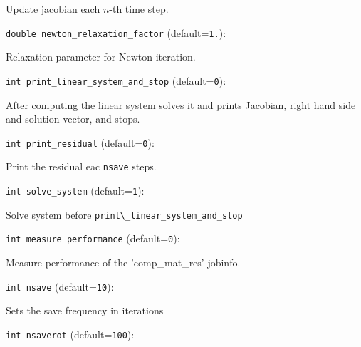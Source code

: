 Update jacobian each $n$-th time step. 

\item\verb+double newton_relaxation_factor+ {\rm(default=\verb|1.|)}:

Relaxation parameter for Newton iteration. 

\item\verb+int print_linear_system_and_stop+ {\rm(default=\verb|0|)}:

After computing the linear system solves it and prints Jacobian,
right hand side and solution vector, and stops. 

\item\verb+int print_residual+ {\rm(default=\verb|0|)}:

Print the residual eac \verb+nsave+ steps. 

\item\verb+int solve_system+ {\rm(default=\verb|1|)}:

Solve system before \verb+print\_linear_system_and_stop+

\item\verb+int measure_performance+ {\rm(default=\verb|0|)}:

Measure performance of the 'comp\_mat\_res' jobinfo. 

\item\verb+int nsave+ {\rm(default=\verb|10|)}:

Sets the save frequency in iterations 

\item\verb+int nsaverot+ {\rm(default=\verb|100|)}:

